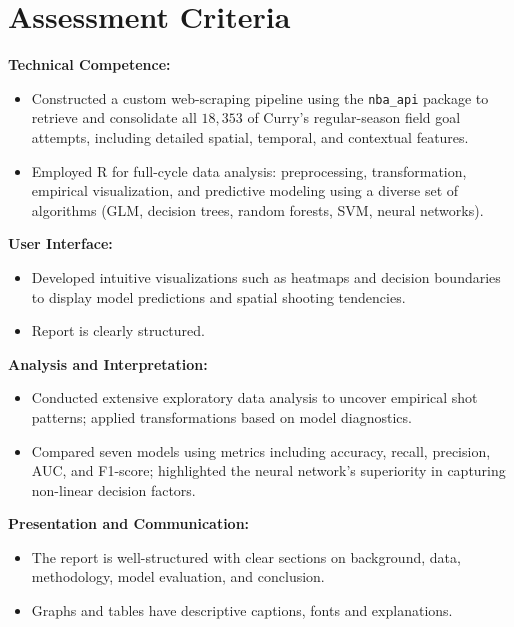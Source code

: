 \documentclass[a4paper, 12pt]{article}
\begin{document}
\section{Assessment Criteria}

\textbf{Technical Competence:} 

\begin{itemize}
\item Constructed a custom web-scraping pipeline using the \texttt{nba\_api} package to retrieve and consolidate all $18,353$ of Curry’s regular-season field goal attempts, including detailed spatial, temporal, and contextual features.
\item Employed R for full-cycle data analysis: preprocessing, transformation, empirical visualization, and predictive modeling using a diverse set of algorithms (GLM, decision trees, random forests, SVM, neural networks).
\end{itemize}

\textbf{User Interface:} 

\begin{itemize}
\item Developed intuitive visualizations such as heatmaps and decision boundaries to display model predictions and spatial shooting tendencies.
\item Report is clearly structured.
\end{itemize}

\textbf{Analysis and Interpretation:} 

\begin{itemize}
\item Conducted extensive exploratory data analysis to uncover empirical shot patterns; applied transformations based on model diagnostics.
\item Compared seven models using metrics including accuracy, recall, precision, AUC, and F1-score; highlighted the neural network’s superiority in capturing non-linear decision factors.
\end{itemize}

\textbf{Presentation and Communication:} 

\begin{itemize}
\item The report is well-structured with clear sections on background, data, methodology, model evaluation, and conclusion. 
\item Graphs and tables have descriptive captions, fonts and explanations.
\end{itemize}
\end{document}
